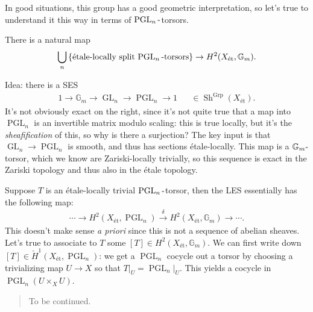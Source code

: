 In good situations, this group has a good geometric interpretation, so
let's true to understand it this way in terms of
\(\operatorname{PGL}_n{\hbox{-}}\)torsors.

\begin{claim}

There is a natural map
\begin{align*}  
\bigcup_n \left\{{ \text{étale-locally split $\operatorname{PGL}_n{\hbox{-}}$torsors} }\right\}
\to
H^2(X_\text{ét}, {\mathbb{G}}_m)
.\end{align*}

\end{claim}

Idea: there is a SES
\begin{align*}  
1 \to {\mathbb{G}}_m \to \operatorname{GL}_n \to \operatorname{PGL}_n \to 1
&& \in {\operatorname{Sh}}^{{\operatorname{Grp}}}(X_\text{ét})
.\end{align*}
It's not obviously exact on the right, since it's not quite true that a
map into \(\operatorname{PGL}_n\) is an invertible matrix modulo
scaling: this is true locally, but it's the \emph{sheafification} of
this, so why is there a surjection? The key input is that
\(\operatorname{GL}_n\to \operatorname{PGL}_n\) is smooth, and thus has
sections étale-locally. This map is a
\({\mathbb{G}}_m{\hbox{-}}\)torsor, which we know are Zariski-locally
trivially, so this sequence is exact in the Zariski topology and thus
also in the étale topology.

Suppose \(T\) is an étale-locally trivial
\(\operatorname{PGL}_n{\hbox{-}}\)torsor, then the LES essentially has
the following map:
\begin{align*}  
\cdots \to H^2(X_\text{ét}, \operatorname{PGL}_n) \xrightarrow{\delta} H^2(X_\text{ét}, {\mathbb{G}}_m) \to \cdots
.\end{align*}
This doesn't make sense \emph{a priori} since this is not a sequence of
abelian sheaves. Let's true to associate to \(T\) some
\([T]\in H^2(X_\text{ét}, {\mathbb{G}}_m)\). We can first write down
\([T] \in {\check{H}}^1(X_\text{ét}, \operatorname{PGL}_n)\): we get a
\(\operatorname{PGL}_n\) cocycle out a torsor by choosing a trivializing
map \(U\to X\) so that
\({ \left.{{T}} \right|_{{U}} } = { \left.{{\operatorname{PGL}_n}} \right|_{{U}} }\).
This yields a cocycle in \(\operatorname{PGL}_n(U\times_X U)\).

\begin{quote}
To be continued.
\end{quote}

